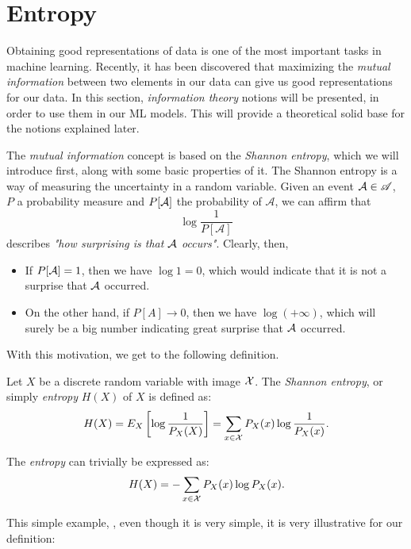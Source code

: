 \section{Entropy}


Obtaining good representations of data is one of the most important tasks in machine learning. 
Recently, it has been discovered \citep{oord_representation_2019} that maximizing the \emph{mutual information} between two elements in our data can give us good representations for our data.
In this section, \emph{information theory} notions will be presented, in order to use them in our ML models. This will provide a theoretical solid base for
the notions explained later.


The \emph{mutual information} concept is based on the \emph{Shannon entropy}, which we will introduce first, along with some basic properties of it. The Shannon entropy is a way of measuring the uncertainty in a random variable. 
Given an event $\mathcal A \in \mathscr{A}$, $P$ a probability measure and $P[\mathcal A]$ the probability of $\mathcal A$, we can affirm that 
$$
\log\frac{1}{P[\mathcal A]}
$$
describes \emph{"how surprising is that $\mathcal A$ occurs"}. Clearly, then, 
\begin{itemize}
\item If $P[\mathcal A]= 1$, then we have $\log 1 = 0$, which would indicate that it is not a surprise that $\mathcal A$ occurred.

\item On the other hand, if $P[A]\to 0$, then we have $\log(+\infty)$, which will surely be a big number indicating great surprise that $\mathcal A$ occurred.
\end{itemize}

With this motivation, we get to the following definition.
\begin{ndef}
Let $X$ be a discrete random variable with image $\mathcal{X}$. The \emph{Shannon entropy}, or simply \emph{entropy}  $H(X)$ of $X$ is defined as:
$$
H(X) = E_X\left[\log\frac{1}{P_X(X)}\right] =  \sum_{x \in \mathcal{X}} P_X(x) \log\frac{1}{P_X(x)}.
$$
\end{ndef}
The \emph{entropy} can trivially be expressed as:
$$
H(X) = - \sum_{x \in \mathcal{X}}P_X (x)\log P_X(x).
$$

This simple example, \citep{cover_elements_1991}, even though it is very simple, it is very illustrative for our definition:

